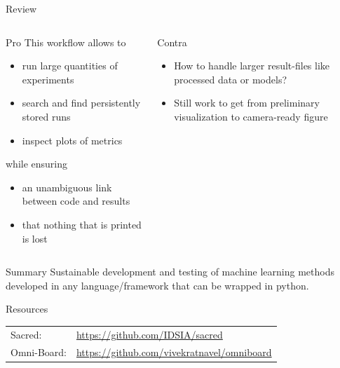 \documentclass[aspectratio=169,10pt]{beamer}
\begin{document}
\begin{frame}[t,fragile]{Review}
\begin{columns}[T]
    \begin{column}{.5\textwidth}
        \begin{alertblock}{Pro}
            This workflow allows to
            \vspace{-2mm}
            \begin{itemize}
                \item run large quantities of experiments
                \item search and find persistently stored runs
                \item inspect plots of metrics
            \end{itemize}
            while ensuring
            \vspace{-2mm}
            \begin{itemize}
                \item an unambiguous link between code and results
                \item that nothing that is printed is lost
            \end{itemize}   
        \end{alertblock}
    \end{column}
    
    \begin{column}{.5\textwidth}    
        \begin{block}{Contra}
            \begin{itemize}
                \item How to handle larger result-files like processed data or models?
                \item Still work to get from preliminary visualization to camera-ready figure
            \end{itemize}
        \end{block}
    \end{column}
    
\end{columns}
\pause
{}
\begin{block}{Summary}
     Sustainable development and testing of machine learning methods developed in any language/framework that can be wrapped in python.
\end{block}
               



\end{frame}
\begin{frame}[fragile]{Resources}
\begin{tabular}{ll}
    Sacred:&\url{https://github.com/IDSIA/sacred}\\
    Omni-Board:& \url{https://github.com/vivekratnavel/omniboard}\\
\end{tabular}
\end{frame}
\end{document}
